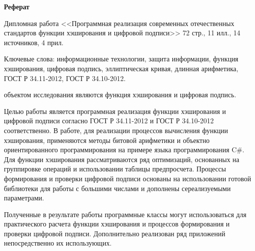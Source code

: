 \begin{center}
	{\large \textbf{Реферат}}
\end{center}
\par
Дипломная работа <<Программная реализация современных отечественных стандартов функции хэширования и цифровой подписи>> 72 стр., 11 илл., 14 источников, 4 прил.
\par
Ключевые слова: информационные технологии, защита информации, функция хэширования, цифровая подпись, эллиптическая кривая, длинная арифметика, ГОСТ Р 34.11-2012, ГОСТ Р 34.10-2012.
\par
объектом исследования являются функция хэширования и цифровая подпись.
\par
Целью работы является программная реализация функции хэширования и цифровой подписи согласно ГОСТ Р 34.11-2012 и ГОСТ Р 34.10-2012 соответственно. В работе, для реализации процессов вычисления функции хэширования, применяются методы битовой арифметики и объектно ориентированного программирования на примере языка программирования C\#. Для функции хэширования рассматриваются ряд оптимизаций, основанных на группировке операций и использовании таблицы предпросчета. Процессы формирования и проверки цифровой подписи основаны на использовании готовой библиотеки для работы с большими числами и дополнены сереализуемыми параметрами.
\par Полученные в результате работы программные классы могут использоваться для практического расчета функции хэширования и процессов формирования и проверки цифровой подписи. Дополнительно реализован ряд приложений непосредственно их использующих.